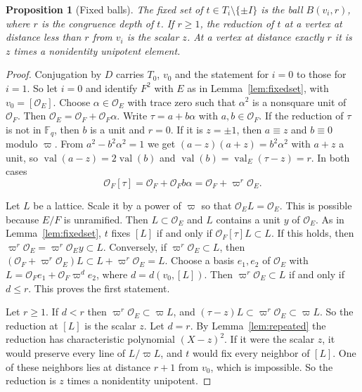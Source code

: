 \documentclass[12pt,letterpaper]{article}
\numberwithin{equation}{section}
\newtheorem{proposition}[theorem]{Proposition}
\theoremstyle{definition}
\theoremstyle{remark}
\newcommand{\OO}{\mathcal O_F}
\newcommand{\OEr}{\mathcal O_E}
\newcommand{\kk}{\mathbb F_q}
\newcommand{\val}{\operatorname{val}}
\begin{document}
\begin{proposition}[Fixed balls]\label{prop:ball}
The fixed set of $t\in T_i\setminus\{\pm I\}$ is the ball $B(v_i,r)$, where $r$ is the congruence depth of $t$. If $r\ge1$, the reduction of $t$ at a vertex at distance less than $r$ from $v_i$ is the scalar $z$. At a vertex at distance exactly $r$ it is $z$ times a nonidentity unipotent element.
\end{proposition}
\begin{proof}
Conjugation by $D$ carries $T_0$, $v_0$ and the statement for $i=0$ to those for $i=1$. So let $i=0$ and identify $F^2$ with $E$ as in Lemma~\ref{lem:fixedset}, with $v_0=[\OEr]$. Choose $\alpha\in\OEr$ with trace zero such that $\alpha^2$ is a nonsquare unit of $\OO$. Then $\OEr=\OO+\OO\alpha$. Write $\tau=a+b\alpha$ with $a,b\in\OO$. If the reduction of $\tau$ is not in $\kk$, then $b$ is a unit and $r=0$. If it is $z=\pm1$, then $a\equiv z$ and $b\equiv0$ modulo $\varpi$. From $a^2-b^2\alpha^2=1$ we get $(a-z)(a+z)=b^2\alpha^2$ with $a+z$ a unit, so $\val(a-z)=2\val(b)$ and $\val(b)=\val_E(\tau-z)=r$. In both cases
\[
 \OO[\tau]=\OO+\OO b\alpha=\OO+\varpi^r\OEr .
\]

Let $L$ be a lattice. Scale it by a power of $\varpi$ so that $\OEr L=\OEr$. This is possible because $E/F$ is unramified. Then $L\subset\OEr$ and $L$ contains a unit $y$ of $\OEr$. As in Lemma~\ref{lem:fixedset}, $t$ fixes $[L]$ if and only if $\OO[\tau]L\subset L$. If this holds, then $\varpi^r\OEr=\varpi^r\OEr y\subset L$. Conversely, if $\varpi^r\OEr\subset L$, then $(\OO+\varpi^r\OEr)L\subset L+\varpi^r\OEr=L$. Choose a basis $e_1,e_2$ of $\OEr$ with $L=\OO e_1+\OO\varpi^de_2$, where $d=d(v_0,[L])$. Then $\varpi^r\OEr\subset L$ if and only if $d\le r$. This proves the first statement.

Let $r\ge1$. If $d<r$ then $\varpi^r\OEr\subset\varpi L$, and $(\tau-z)L\subset\varpi^r\OEr\subset\varpi L$. So the reduction at $[L]$ is the scalar $z$. Let $d=r$. By Lemma~\ref{lem:repeated} the reduction has characteristic polynomial $(X-z)^2$. If it were the scalar $z$, it would preserve every line of $L/\varpi L$, and $t$ would fix every neighbor of $[L]$. One of these neighbors lies at distance $r+1$ from $v_0$, which is impossible. So the reduction is $z$ times a nonidentity unipotent.
\end{proof}
\end{document}
